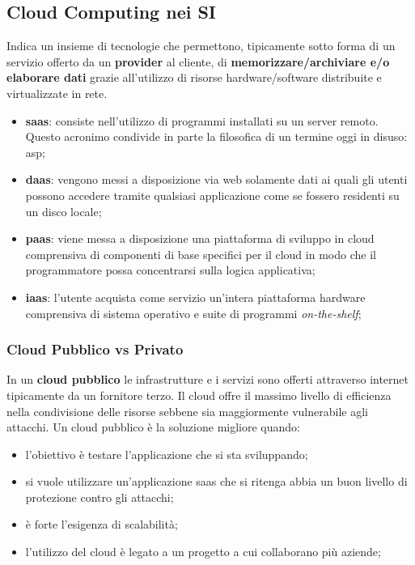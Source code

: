 \subsection{Cloud Computing nei SI}\label{sub:ftt_cloud_computing_nei_si} %
Indica un insieme di tecnologie che permettono, tipicamente sotto forma di un servizio offerto da un \textbf{provider} al cliente, di \textbf{memorizzare/archiviare e/o elaborare dati} grazie all'utilizzo di risorse hardware/software distribuite e virtualizzate in rete.
\begin{itemize}
    \item \textbf{\ac{saas}}: consiste nell'utilizzo di programmi installati su un server remoto.
        Questo acronimo condivide in parte la filosofica di un termine oggi in disuso: \acf{asp};
    \item \textbf{\ac{daas}}: vengono messi a disposizione via web solamente dati ai quali gli utenti possono accedere tramite qualsiasi applicazione come se fossero residenti su un disco locale;
    \item \textbf{\ac{paas}}: viene messa a disposizione una piattaforma di sviluppo in cloud comprensiva di componenti di base specifici per il cloud in modo che il programmatore possa concentrarsi sulla logica applicativa;
    \item \textbf{\ac{iaas}}: l'utente acquista come servizio un'intera piattaforma hardware comprensiva di sistema operativo e suite di programmi \textit{on-the-shelf};
\end{itemize}
%
\subsubsection{Cloud Pubblico vs Privato}\label{sub:ftt_cloud_pubblico_vs_privato} %
In un \textbf{cloud pubblico} le infrastrutture e i servizi sono offerti attraverso internet tipicamente da un fornitore terzo.
Il cloud offre il massimo livello di efficienza nella condivisione delle risorse sebbene sia maggiormente vulnerabile agli attacchi.
Un cloud pubblico è la soluzione migliore quando:
\begin{itemize}
    \item l'obiettivo è testare l'applicazione che si sta sviluppando;
    \item si vuole utilizzare un'applicazione \ac{saas} che si ritenga abbia un buon livello di protezione contro gli attacchi;
    \item è forte l'esigenza di scalabilità;
    \item l'utilizzo del cloud è legato a un progetto a cui collaborano più aziende;
\end{itemize}
%
